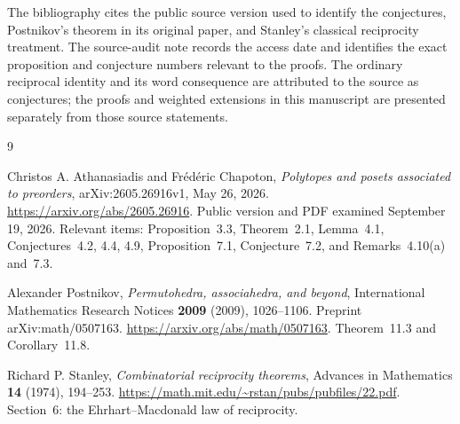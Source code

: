 \documentclass[11pt,letterpaper]{article}
\theoremstyle{definition}
\begin{document}
The bibliography cites the public source version used to identify the
conjectures, Postnikov's theorem in its original paper, and Stanley's
classical reciprocity treatment. The source-audit note records the access
date and identifies the exact proposition and conjecture numbers relevant
to the proofs. The ordinary reciprocal identity and its word consequence
are attributed to the source as conjectures; the proofs and weighted
extensions in this manuscript are presented separately from those source
statements.

\begin{thebibliography}{9}

Christos A. Athanasiadis and Fr\'ed\'eric Chapoton,
\emph{Polytopes and posets associated to preorders},
arXiv:2605.26916v1, May 26, 2026.
\url{https://arxiv.org/abs/2605.26916}.
Public version and PDF examined September 19, 2026.
Relevant items: Proposition~3.3, Theorem~2.1, Lemma~4.1,
Conjectures~4.2, 4.4, 4.9, Proposition~7.1, Conjecture~7.2,
and Remarks~4.10(a) and~7.3.

Alexander Postnikov,
\emph{Permutohedra, associahedra, and beyond},
International Mathematics Research Notices \textbf{2009} (2009), 1026--1106.
Preprint arXiv:math/0507163.
\url{https://arxiv.org/abs/math/0507163}.
Theorem~11.3 and Corollary~11.8.

Richard P. Stanley,
\emph{Combinatorial reciprocity theorems},
Advances in Mathematics \textbf{14} (1974), 194--253.
\url{https://math.mit.edu/~rstan/pubs/pubfiles/22.pdf}.
Section~6: the Ehrhart--Macdonald law of reciprocity.

\end{thebibliography}
\end{document}
